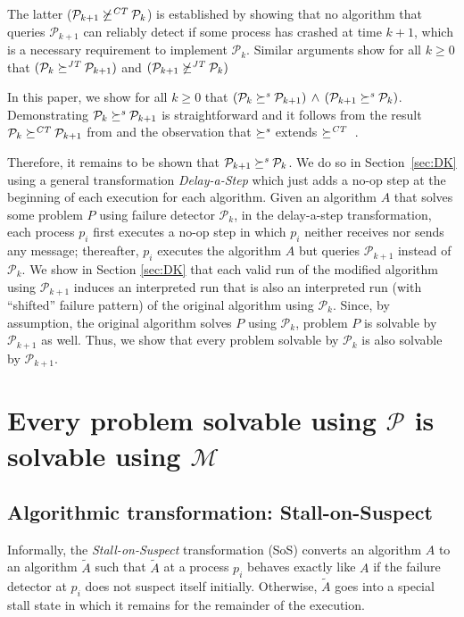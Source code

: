 \documentclass[11pt]{article}
\newcommand{\ident}[1]{\textit{#1}\rule{0cm}{1ex}}
\newcommand{\PFD}{\ensuremath{\mathcal{P}}}
\newcommand{\MFD}{\ensuremath{\mathcal{M}}}
\newcommand{\problem}{P} \newcommand{\Alg}{A}
\newcommand{\TrAlg}{\widetilde{A}}
\newcommand{\redCT}{\succeq^\ident{CT}}
\newcommand{\redJT}{\succeq^\ident{JT}}
\newcommand{\redSolv}{\succeq^{\ident{s}}}
\begin{document}
The latter ($\PFD_{k+1} \not\redCT \PFD_{k}$) is established by
     showing that no algorithm that queries $\PFD_{k+1}$ can reliably
     detect if some process has crashed at time $k+1$, which is a
     necessary requirement to implement $\PFD_k$.
Similar arguments show  for all $k\ge 0$ that $(\PFD_{k} \redJT
     \PFD_{k+1})$ and $(\PFD_{k+1} \not\redJT \PFD_{k})$  


In this paper, we show for all $k\ge 0$ that $(\PFD_{k} \redSolv
     \PFD_{k+1})\, \wedge\, (\PFD_{k+1} \redSolv \PFD_{k})$.
Demonstrating $\PFD_{k} \redSolv \PFD_{k+1}$ is straightforward and it
     follows from the result $\PFD_{k} \redCT \PFD_{k+1}$ from
     \cite{bhatt:oteow} and the observation that $\redSolv$ extends
     $\redCT$ \cite{chan:ufdfr}.

Therefore, it remains to be shown that $\PFD_{k+1} \redSolv \PFD_{k}$.
We do so in Section~\ref{sec:DK} using a general transformation
     \emph{Delay-a-Step} which just adds a no-op step at the beginning
     of each execution for each algorithm.
Given an algorithm $\Alg$ that solves some problem $\problem$ using
     failure detector $\PFD_{k}$, in the delay-a-step transformation,
     each process $p_i$ first executes a no-op step in which $p_i$
     neither receives nor sends any message; thereafter, $p_i$
     executes the algorithm $\Alg$ but queries $\PFD_{k+1}$ instead of
     $\PFD_k$.
We show in Section \ref{sec:DK} that each valid run of the modified
     algorithm using $\PFD_{k+1}$ induces an interpreted run that is
     also an interpreted run (with ``shifted'' failure pattern) of the
     original algorithm using $\PFD_k$.
Since, by assumption, the original algorithm solves $\problem$ using
     $\PFD_k$, problem $\problem$ is solvable by $\PFD_{k+1}$ as well.
Thus, we show that every problem solvable by $\PFD_k$ is also solvable
     by $\PFD_{k+1}$.




\section{Every problem solvable using $\PFD$ is solvable using $\MFD$}
\label{sec:MP}

\subsection{Algorithmic transformation: Stall-on-Suspect}
\label{subsec:algTrans}

Informally, the \emph{Stall-on-Suspect} transformation (SoS) converts
     an algorithm $\Alg$ to an algorithm $\TrAlg$ such that $\TrAlg$
     at a process $p_i$ behaves exactly like $\Alg$ if the failure
     detector at $p_i$ does not suspect itself initially.
Otherwise, $\TrAlg$ goes into a special stall state in which it
     remains for the remainder of the execution.
 
\end{document}
